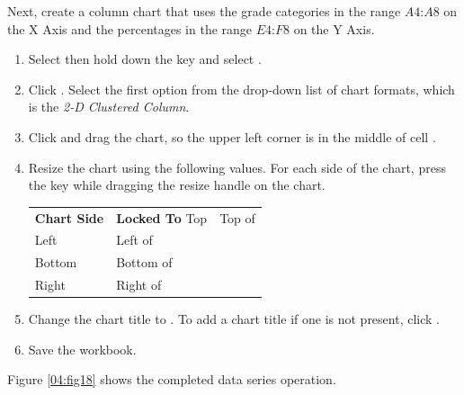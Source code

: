 Next, create a column chart that uses the grade categories in the range $ A4 $:$ A8 $ on the X Axis and the percentages in the range $ E4 $:$ F8 $ on the Y Axis. 

\begin{enumbox}
	\begin{enumerate}
		\item Select  then hold down the  key and select .
		\item Click . Select the first option from the drop-down list of chart formats, which is the \textit{2-D Clustered Column}.
		\item Click and drag the chart, so the upper left corner is in the middle of cell .
		\item Resize the chart using the following values. For each side of the chart, press the  key while dragging the resize handle on the chart.
	
		\begin{table}[H]
		\captionsetup{labelformat=empty} %
		{\small
			\begin{longtable}{R{0.75in}L{1.50in}} %
				\textbf{Chart Side} & \textbf{Locked To} \endhead
				\hline
				Top & Top of \\
				Left & Left of \\
				Bottom & Bottom of \\
				Right & Right of \\
			\end{longtable}
		} %
		\end{table}
	
		\item Change the chart title to . To add a chart title if one is not present, click .
		\item Save the  workbook.
	\end{enumerate}
\end{enumbox}

Figure \ref{04:fig18} shows the completed data series operation.

